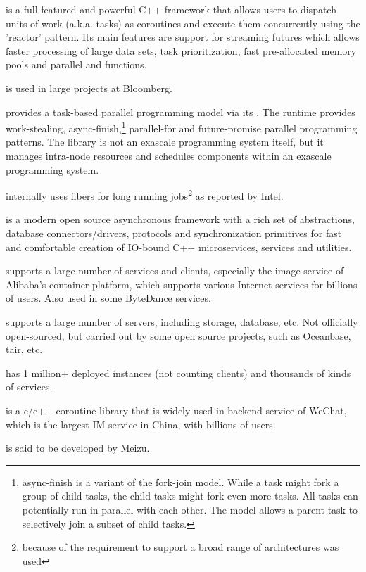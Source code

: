 \cite{bbquantum} is a full-featured and
powerful C++ framework that allows users to dispatch units of work (a.k.a.
tasks) as coroutines and execute them concurrently using the 'reactor' pattern.
Its main features are support for streaming futures which allows faster processing
of large data sets, task prioritization, fast pre-allocated memory pools and
parallel  and  functions.

\bbquantum\xspace is used in large projects at Bloomberg.

provides a task-based parallel programming model via its \hclib\cite{hclib}.
The runtime provides work-stealing, async-finish,\footnote{async-finish is a
variant of the fork-join model. While a task might fork a group of
child tasks, the child tasks might fork even more tasks. All tasks can
potentially run in parallel with each other. The model allows a parent task to
selectively join a subset of child tasks.}
parallel-for and future-promise parallel programming patterns. The library is not an exascale
programming system itself, but it manages intra-node resources and schedules
components within an exascale programming system.

\cite{tbb} internally uses fibers for long running
jobs\footnote{because of the requirement to support a broad range of
architectures \href{https://github.com/intel/tbb/blob/tbb_2020/src/tbb/co_context.h\#L190}
{\swapcontext} was used} as reported by Intel.

\uabschnitt{\userver}\cite{userver} is a modern open source asynchronous
framework with a rich set of abstractions, database connectors/drivers,
protocols and synchronization primitives for fast and comfortable creation
of IO-bound C++ microservices, services and utilities.

\cite{photon} supports a large number of services
and clients, especially the image service of Alibaba’s container platform,
which supports various Internet services for billions of users.
Also used in some ByteDance services.

\cite{libeasy} supports a large number of
servers, including storage, database, etc. Not officially open-sourced, but
carried out by some open source projects, such as Oceanbase, tair, etc.

\cite{bthread} has 1 million+ deployed instances
(not counting clients) and thousands of kinds of services.

\cite{libco} is a c/c++ coroutine library that
is widely used in backend service of WeChat, which is the largest IM service
in China, with billions of users. 

\uabschnitt{\libgo}\cite{libgo} is said to be developed by Meizu.

